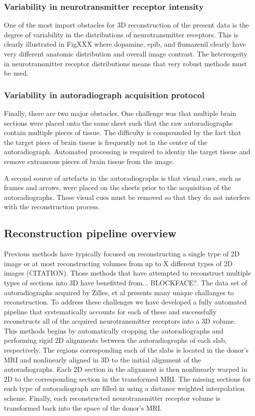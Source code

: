 \documentclass[12pt]{article}
\begin{document}
\subsubsection{Variability in neurotransmitter receptor intensity}

One of the most import obstacles for 3D reconstruction of the present data is the degree of variability in the distributions of neurotransmitter receptors. This is clearly illustrated in FigXXX where dopamine, epib, and flumazenil clearly have very different anatomic distribution and overall image contrast. The hetereogeity in neurotransmitter receptor distributions means that very robust methods must be used.

\subsubsection{Variability in autoradiograph acquisition protocol }

Finally, there are two major obstacles. One challenge was that multiple brain sections were placed onto the same sheet such that the raw autoradiographs contain multiple pieces of tissue. The difficulty is compounded by the fact that the target piece of brain tissue is frequently not in the center of the autoradiograph. Automated processing is required to identiy the target tissue and remove extraneous pieces of brain tissue from the image. 

A second source of artefacts in the autoradiographs is that visual cues, such as frames and arrows, were placed on the sheets prior to the acquisition of the autoradiographs. These visual cues must be removed so that they do not interfere with the reconstruction process. 

\subsection{Reconstruction pipeline overview}
Previous methods have typically focused on reconstructing a single type of 2D image or at most reconstructing volumes from up to X different types of 2D images (CITATION). Those methods that have attempted to reconstruct multiple types of sections into 3D have benefitted from... BLOCKFACE?. The data set of autoradiographs acquired by Zilles, et al \cite{Zilles2004} presents many unique challanges to reconstruction. To address these challenges we have developed a fully automated pipeline that systematically accounts for each of these and successfully reconstructs all of the acquired neurotransmitter receptors into a 3D volume. This methods begins by automatically cropping the autoradiographs and performing rigid 2D alignments between the autoradiographs of each slab, respectively. The regions corresponding each of the slabs is located in the donor's MRI and nonlinearly aligned in 3D to the initial alignment of the autoradiographs. Each 2D section in the alignment is then nonlinearly warped in 2D to the corresponding section in the transformed MRI. The missing sections for each type of autoradiograph are filled in using a distance weighted interpolation scheme. Finally, each reconstructed neurotransmitter receptor volume is transformed back into the space of the donor's MRI.
\end{document}
